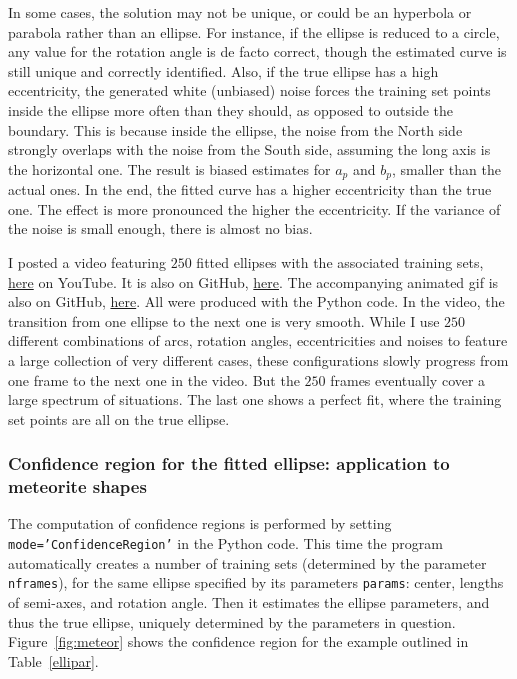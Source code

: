 \documentclass[oneside,10pt]{book}
\begin{document}
In some cases, the solution may not be unique, or could be an hyperbola or parabola rather than an ellipse. For instance, if the ellipse is reduced to a circle, any value for the rotation angle is de facto correct, though the estimated curve is still unique and correctly identified. Also, if the true ellipse has a high eccentricity, the generated white (unbiased) noise
 forces the training set points inside the ellipse more often than they should, as opposed to outside the boundary. This is because inside the ellipse, the noise from the North side strongly overlaps with the noise from the South side, assuming the long axis is the horizontal one. The result is biased estimates for $a_p$ and $b_p$, smaller than the actual ones. In the end, the fitted curve has a higher eccentricity than the true one. The effect is more pronounced the higher the eccentricity. If the variance of the noise is small enough, there is almost no bias.

I posted a video featuring $250$ fitted ellipses with the associated training sets, \href{https://youtu.be/ReyA9NWyjso}{here}  on YouTube.
It is also on GitHub, \href{https://github.com/VincentGranville/Machine-Learning/blob/main/Images/ellipseFitting300dpi.mp4}{here}. The accompanying animated gif is also on GitHub, \href{https://github.com/VincentGranville/Machine-Learning/blob/main/Images/ellipse100dpi.gif}{here}. All were produced with the Python code. In the video, the transition from one ellipse to the next one is very smooth. While I use $250$ different combinations of arcs, rotation angles, eccentricities and noises to feature a large collection of very different cases, these configurations slowly progress from one frame to the next one in the video. But the $250$ frames eventually cover a large spectrum of situations. The last one shows a perfect fit, where the training set points are all on the true ellipse.


\subsubsection{Confidence region for the fitted ellipse: application to meteorite shapes}\label{rt543erzxswa}

The computation of \textcolor{index}{confidence regions} is performed by setting \texttt{mode='ConfidenceRegion'} in the Python code. This time the program automatically creates a number of training sets (determined by the parameter \texttt{nframes}), for the same ellipse
specified by its parameters \texttt{params}: center, lengths of semi-axes, and rotation angle.
 Then it estimates the ellipse parameters, and thus the true ellipse, uniquely determined by the parameters in question. Figure~\ref{fig:meteor} shows the confidence region for the example outlined in Table~\ref{ellipar}.
\end{document}
